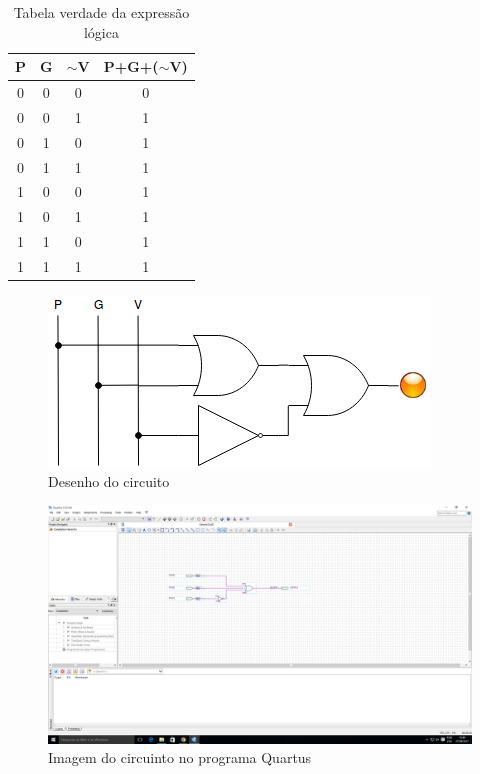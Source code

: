 	\begin{table}[h]
		\centering
		\caption{Tabela verdade da expressão lógica}\label{table:tabelaVerdade2}
		\begin{tabular}{c|c|c|c}
			\textbf{P} & \textbf{G} & \textbf{$\sim$V} & \textbf{P+G+($\sim$V)} \\
			\hline
			0 & 0 & 0 & 0\\\hline
			0 & 0 & 1 & 1\\\hline
			0 & 1 & 0 & 1\\\hline
			0 & 1 & 1 & 1\\\hline
			1 & 0 & 0 & 1\\\hline
			1 & 0 & 1 & 1\\\hline
			1 & 1 & 0 & 1\\\hline
			1 & 1 & 1 & 1
		\end{tabular}
	\end{table}

	\begin{figure}[H]
	    \centering
		\caption{\label{fig:desenhoCircuito2}Desenho do circuito}
		\includegraphics{img/cenario2/desenhoCircuito}
	\end{figure}


	\begin{figure}[H]
	    \centering
		\caption{\label{fig:printCircuito2}Imagem do circuinto no programa Quartus}
		\includegraphics[width=1\textwidth]{img/cenario2/printCircuito}
	\end{figure}

